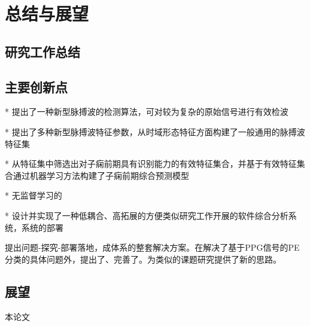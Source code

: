 \chapter{总结与展望}
\section{研究工作总结}
\section{主要创新点}
* 提出了一种新型脉搏波的检测算法，可对较为复杂的原始信号进行有效检波

* 提出了多种新型脉搏波特征参数，从时域形态特征方面构建了一般通用的脉搏波特征集

* 从特征集中筛选出对子痫前期具有识别能力的有效特征集合，并基于有效特征集合通过机器学习方法构建了子痫前期综合预测模型

* 无监督学习的

* 设计并实现了一种低耦合、高拓展的方便类似研究工作开展的软件综合分析系统，系统的部署

提出问题-探究-部署落地，成体系的整套解决方案。在解决了基于PPG信号的PE分类的具体问题外，提出了、完善了。为类似的课题研究提供了新的思路。

\section{展望}
本论文